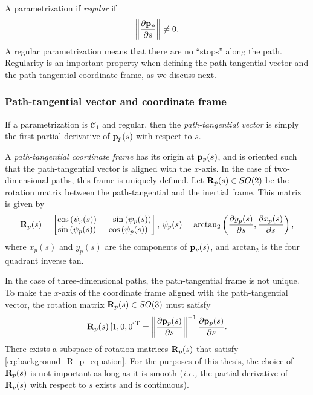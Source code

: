 A parametrization if \emph{regular} if
\begin{equation}
    \left\|\frac{\partial \mathbf{p}_p}{\partial s}\right\| \neq 0.
\end{equation}
A regular parametrization means that there are no ``stops'' along the path.
Regularity is an important property when defining the path-tangential vector and the path-tangential coordinate frame, as we discuss next.

\subsubsection*{Path-tangential vector and coordinate frame}
If a parametrization is $\mathcal{C}_1$ and regular, then the \emph{path-tangential vector} is simply the first partial derivative of $\mathbf{p}_p(s)$ with respect to $s$.

A \emph{path-tangential coordinate frame} has its origin at $\mathbf{p}_p(s)$, and is oriented such that the path-tangential vector is aligned with the $x$-axis.
In the case of two-dimensional paths, this frame is uniquely defined.
Let $\mathbf{R}_p(s) \in SO(2)$ be the rotation matrix between the path-tangential and the inertial frame.
This matrix is given by
\begin{equation}
    \mathbf{R}_p(s) = 
    \begin{bmatrix}
        \cos\left(\psi_{p}(s)\right) & -\sin\left(\psi_{p}(s)\right) \\ \sin\left(\psi_{p}(s)\right) & \cos\left(\psi_{p}(s)\right)
    \end{bmatrix}, \,
    \psi_{p}(s) = \mathrm{arctan}_{2}\left(\frac{\partial  y_{p}(s)}{\partial s}, \frac{\partial  x_{p}(s)}{\partial s}\right),
\end{equation}
where $x_p(s)$ and $y_p(s)$ are the components of $\mathbf{p}_p(s)$, and $\mathrm{arctan}_2$ is the four quadrant inverse tan.

In the case of three-dimensional paths, the path-tangential frame is not unique.
To make the $x$-axis of the coordinate frame aligned with the path-tangential vector, the rotation matrix $\mathbf{R}_p(s) \in SO(3)$ must satisfy
\begin{equation}
    \mathbf{R}_p(s) \left[1, 0, 0\right]^{\mathrm{T}} = \left\|\frac{\partial \mathbf{p}_p(s)}{\partial s}\right\|^{-1} \frac{\partial \mathbf{p}_p(s)}{\partial s}.
    \label{eq:background_R_p_equation}
\end{equation}
There exists a subspace of rotation matrices $\mathbf{R}_p(s)$ that satisfy \eqref{eq:background_R_p_equation}.
For the purposes of this thesis, the choice of $\mathbf{R}_p(s)$ is not important as long as it is smooth (\emph{i.e.,} the partial derivative of $\mathbf{R}_p(s)$ with respect to $s$ exists and is continuous).

